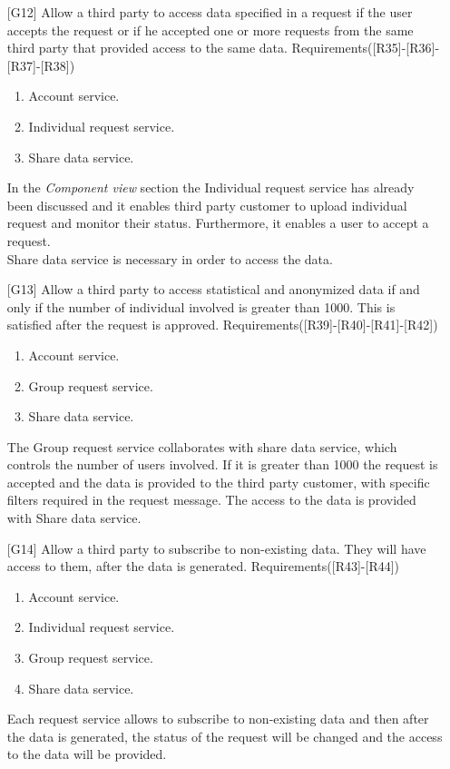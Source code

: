 \begin{itemize}
\item[{[G12]}] Allow a third party to access data specified in a request if the user accepts the request or if he accepted one or more requests from the same third party that provided access to the same data. Requirements([R35]-[R36]-[R37]-[R38])
	\begin{enumerate}
	\item Account service.
	\item Individual request service.
	\item Share data service.
	\end{enumerate}
In the \textit{Component view} section the Individual request service has already been discussed and it enables third party customer to upload individual request and monitor their status. Furthermore, it enables a user to accept a request. \\
Share data service is necessary in order to access the data.	
	
\item[{[G13]}] Allow a third party to access statistical and anonymized data if and only if the number of individual involved is greater than 1000. This is satisfied after the request is approved. Requirements([R39]-[R40]-[R41]-[R42])
	\begin{enumerate}
	\item Account service.
	\item Group request service.
	\item Share data service. 
	\end{enumerate}
The Group request service collaborates with share data service, which controls the number of users involved. If it is greater than 1000 the request is accepted and the data is provided to the third party customer, with specific filters required in the request message. 
The access to the data is provided with Share data service.
	
\item[{[G14]}] Allow a third party to subscribe to non-existing data. They will have access to them, after the data is generated. Requirements([R43]-[R44])
	\begin{enumerate}
	\item Account service.
	\item Individual request service.
	\item Group request service.
	\item Share data service.
	\end{enumerate}
	
Each request service allows to subscribe to non-existing data and then after the data is generated, the status of the request will be changed
and the access to the data will be provided.
\end{itemize}

